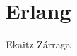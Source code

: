 \documentclass[a4paper,10pt]{article}
\title{Erlang}
\author{Ekaitz Zárraga}
\begin{document}
\maketitle

\begin{abstract}
\end{abstract}

\newpage
  \tableofcontents
\newpage
{}





\end{document}
